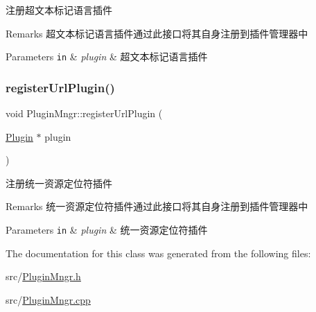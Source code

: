 注册超文本标记语言插件 

\begin{DoxyRemark}{Remarks}
超文本标记语言插件通过此接口将其自身注册到插件管理器中 
\end{DoxyRemark}

\begin{DoxyParams}[1]{Parameters}
\mbox{\tt in}  & {\em plugin} & 超文本标记语言插件 \\
\hline
\end{DoxyParams}
\mbox{\label{class_plugin_mngr_a016ae68984aa3c04a32eaf29a334b5d5}} 
\subsubsection{\texorpdfstring{register\+Url\+Plugin()}{registerUrlPlugin()}}
{\footnotesize\ttfamily void Plugin\+Mngr\+::register\+Url\+Plugin (\begin{DoxyParamCaption}\item[{\hyperlink{class_plugin}{Plugin} $\ast$}]{plugin }\end{DoxyParamCaption})}



注册统一资源定位符插件 

\begin{DoxyRemark}{Remarks}
统一资源定位符插件通过此接口将其自身注册到插件管理器中 
\end{DoxyRemark}

\begin{DoxyParams}[1]{Parameters}
\mbox{\tt in}  & {\em plugin} & 统一资源定位符插件 \\
\hline
\end{DoxyParams}


The documentation for this class was generated from the following files\+:\begin{DoxyCompactItemize}
\item 
src/\hyperlink{_plugin_mngr_8h}{Plugin\+Mngr.\+h}\item 
src/\hyperlink{_plugin_mngr_8cpp}{Plugin\+Mngr.\+cpp}\end{DoxyCompactItemize}
